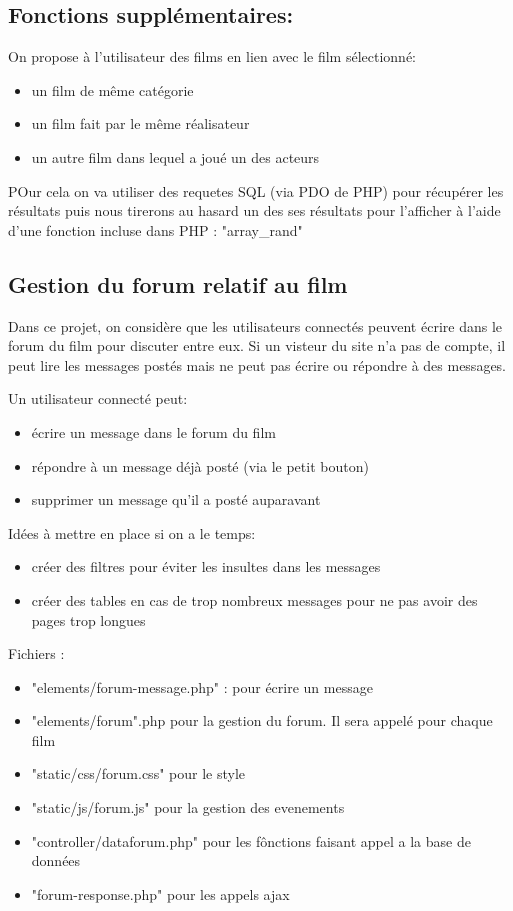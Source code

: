 \documentclass[a4paper, 11pt]{MyReport}
\begin{document}
			\subsection{Fonctions supplémentaires:}

				On propose à l'utilisateur des films en lien avec le film sélectionné:
				\begin{itemize}
					\item un film de même catégorie
					\item un film fait par le même réalisateur
					\item un autre film dans lequel a joué un des acteurs
				\end{itemize}

				POur cela on va utiliser des requetes SQL (via PDO de PHP) pour récupérer les résultats puis nous tirerons au hasard un des ses résultats pour l'afficher à l'aide d'une fonction incluse dans PHP : "array\_rand"


			\subsection{Gestion du forum relatif au film}

				Dans ce projet, on considère que les utilisateurs connectés peuvent écrire dans le forum du film pour discuter entre eux. Si un visteur du site n'a pas de compte, il peut lire les messages postés mais ne peut pas écrire ou répondre à des messages.

				\medskip
				Un utilisateur connecté peut:
				\begin{itemize}
					\item écrire un message dans le forum du film
					\item répondre à un message déjà posté (via le petit bouton) 
					\item supprimer un message qu'il a posté auparavant
				\end{itemize}


				\bigskip
				Idées à mettre en place si on a le temps:
				\begin{itemize}
					\item créer des filtres pour éviter les insultes dans les messages
					\item créer des tables en cas de trop nombreux messages pour ne pas avoir des pages trop longues 
				\end{itemize}

				\bigskip
				Fichiers :
				\begin{itemize}
					\item "elements/forum-message.php" : pour écrire un message
					\item "elements/forum".php pour la gestion du forum. Il sera appelé pour chaque film
					\item "static/css/forum.css" pour le style
					\item "static/js/forum.js" pour la gestion des evenements
					\item "controller/dataforum.php" pour les fônctions faisant appel a la base de données
					\item "forum-response.php" pour les appels ajax
				\end{itemize}
\end{document}
